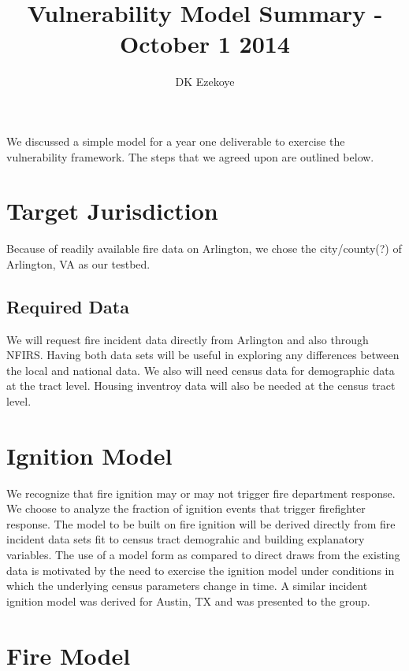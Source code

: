 \documentclass[12pt,oneside]{article}
\begin{document}
\title{Vulnerability Model Summary - October 1 2014}
\author{DK Ezekoye}

\maketitle

We discussed a simple model for a year one deliverable to exercise the vulnerability framework. The steps that we agreed upon are outlined below.

\section{Target Jurisdiction}

Because of readily available fire data on Arlington, we chose the city/county(?)  of Arlington, VA as our testbed. 

\subsection{Required Data}

We will request fire incident data directly from Arlington and also through NFIRS. Having both data sets will be useful in exploring any differences between the local and national data. We also will need census data for demographic data at the tract level.  Housing inventroy data will also be needed at the census tract level.

\section{Ignition Model}

We recognize that fire ignition may or may not trigger fire department response. We choose to analyze the fraction of ignition events that trigger firefighter response. The model to be built on fire ignition will be derived directly from fire incident data sets fit to census tract demograhic and building explanatory variables.  The use of a model form as compared to direct draws from the existing data is motivated by the need to exercise the ignition model under conditions in which the underlying census parameters change in time.  A similar incident ignition model was derived for Austin, TX and was presented to the group.

\section{Fire Model}
\end{document}
